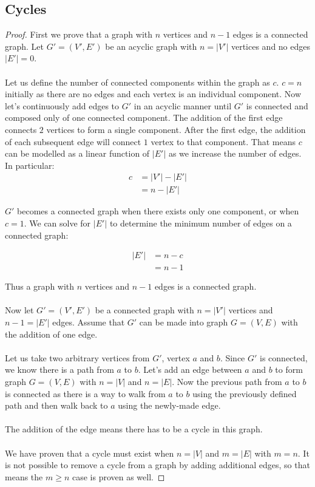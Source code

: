 \documentclass{article}
\begin{document}
\subsection{Cycles}

    \begin{proof}
        First we prove that a graph with \(n\) vertices and \(n-1\) edges is a connected graph. Let \(G' = (V', E')\) be an acyclic graph with \(n = |V'|\) vertices and no edges \(|E'| = 0\). \\\\
        Let us define the number of connected components within the graph as \(c\). \(c = n\) initially as there are no edges and each vertex is an individual component. Now let's continuously add edges to \(G'\) in an acyclic manner until \(G'\) is connected and composed only of one connected component. The addition of the first edge connects \(2\) vertices to form a single component. After the first edge, the addition of each subsequent edge will connect \(1\) vertex to that component. That means \(c\) can be modelled as a linear function of \(|E'|\) as we increase the number of edges. In particular:
        \begin{align*}
            c &= |V'| - |E'| \\
            &= n - |E'|
        \end{align*}
        
        \(G'\) becomes a connected graph when there exists only one component, or when \(c = 1\). We can solve for \(|E'|\) to determine the minimum number of edges on a connected graph:
        
        \begin{align*}
            |E'| &= n - c \\
            &= n - 1
        \end{align*}
        
        Thus a graph with \(n\) vertices and \(n-1\) edges is a connected graph. \\\\
        
        Now let \(G' = (V', E')\) be a connected graph with \(n = |V'|\) vertices and \(n-1 = |E'|\) edges. Assume that \(G'\) can be made into graph \(G = (V, E)\) with the addition of one edge. \\\\
        
        Let us take two arbitrary vertices from \(G'\), vertex \(a\) and \(b\). Since \(G'\) is connected, we know there is a path from \(a\) to \(b\).
        Let's add an edge between \(a\) and \(b\) to form graph \(G=(V, E)\) with \(n = |V|\) and \(n = |E|\). Now the previous path from \(a\) to \(b\) is connected as there is a way to walk from \(a\) to \(b\) using the previously defined path and then walk back to \(a\) using the newly-made edge. \\\\
        The addition of the edge means there has to be a cycle in this graph. \\\\
        
        We have proven that a cycle must exist when \(n = |V|\) and \(m = |E|\) with \(m = n\). It is not possible to remove a cycle from a graph by adding additional edges, so that means the \(m \geq n\) case is proven as well.
    \end{proof}
\end{document}
